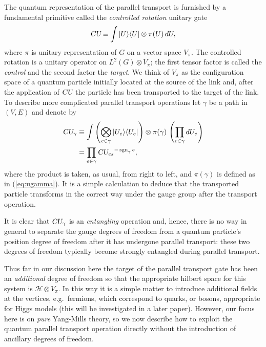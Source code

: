\documentclass[twocolumn,lengthcheck,superscriptaddress]{revtex4-1}
\newcommand{\sgn}{\operatorname{sgn}}
\def\CU{\textsl{CU}}
\theoremstyle{definition}
\theoremstyle{remark}
\begin{document}
The quantum representation of the parallel transport is furnished by a fundamental primitive called the \emph{controlled rotation} unitary gate
\begin{equation}
	\CU \equiv \int |U\rangle\langle U| \otimes \pi(U)\,dU,
\end{equation}
where $\pi$ is unitary representation of $G$ on a vector space $V_\pi$. The controlled rotation is a unitary operator on $L^2(G)\otimes V_\pi$; the first tensor factor is called the \emph{control} and the second factor the \emph{target}. We think of $V_\pi$ as the configuration space of a quantum particle initially located at the source of the link and, after the application of $\CU$ the particle has been transported to the target of the link. To describe more complicated parallel transport operations let $\gamma$ be a path in $(V,E)$ and denote by
\begin{equation}
	\begin{split}
		\CU_\gamma &\equiv \int   \left(\bigotimes_{e\in \gamma} |U_e\rangle\langle U_e|\right) \otimes \pi(\gamma)\, \left(\prod_{e\in \gamma} dU_e\right) \\
		&= \prod_{e\in \gamma} {\CU_{e s}}^{-\sgn_\gamma{e}},
	\end{split}
\end{equation}
where the product is taken, as usual, from right to left, and $\pi(\gamma)$ is defined as in (\ref{eq:ugamma}). It is a simple calculation to deduce that the transported particle transforms in the correct way under the gauge group after the transport operation.


It is clear that $\CU_\gamma$ is an \emph{entangling} operation and, hence, there is no way in general to separate the gauge degrees of freedom from a quantum particle's position degree of freedom after it has undergone parallel transport: these two degrees of freedom typically become strongly entangled during parallel transport.

Thus far in our discussion here the target of the parallel transport gate has been an \emph{additional} degree of freedom so that the appropriate hilbert space for this system is $\mathcal{H}\otimes V_\pi$. In this way it is a simple matter to introduce additional fields at the vertices, e.g.\ fermions, which correspond to quarks, or bosons, appropriate for Higgs models (this will be investigated in a later paper). However, our focus here is on \emph{pure} Yang-Mills theory, so we now describe how to exploit the quantum parallel transport operation directly without the introduction of ancillary degrees of freedom.
\end{document}
